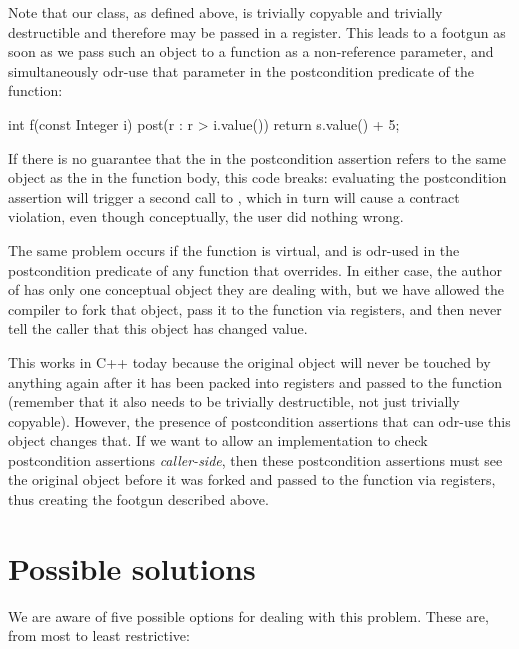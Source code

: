 Note that our  class, as defined above, is trivially copyable and trivially destructible and therefore may be passed in a register. This leads to a footgun as soon as we pass such an object to a function as a non-reference parameter, and simultaneously odr-use that parameter in the postcondition predicate of the function: 
 \begin{codeblock}
int f(const Integer i)
post(r : r > i.value()) {
  return s.value() + 5;
}
 \end{codeblock}
If there is no guarantee that the  in the postcondition assertion refers to the same object as the  in the function body, this code breaks: evaluating the postcondition assertion will trigger a second call to , which in turn will cause a contract violation, even though conceptually, the user did nothing wrong.
 
The same problem occurs if the function  is virtual, and  is odr-used in the postcondition predicate of any function that  overrides. In either case, the author of  has only one conceptual  object they are dealing with, but we have allowed the compiler to fork that object, pass it to the function via registers, and then never tell the caller that this object has changed value.

This works in C++ today because the original object will never be touched by anything again after it has been packed into registers and passed to the function (remember that it also needs to be trivially destructible, not just trivially copyable). However, the presence of postcondition assertions that can odr-use this object changes that. If we want to allow an implementation to check postcondition assertions \emph{caller-side}, then these postcondition assertions must see the original object before it was forked and passed to the function via registers, thus creating the footgun described above.

\section{Possible solutions}

We are aware of five possible options for dealing with this problem. These are, from most to least
restrictive:

